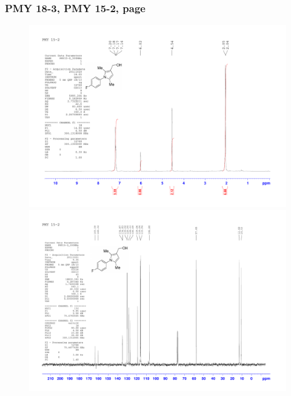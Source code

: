 \documentclass[12pt, a4paper,titlepage]{article}
\begin{document}
{\subsubsection*{PMY 18-3, PMY 15-2, page \pageref{exp:PMY15}}
\label{spec:PMY15}
	\begin{figure}[H] 
	\begin{center}
	\includegraphics[width=14.5cm]{expdata/PMY15/1H}
	\includegraphics[width=14.5cm]{expdata/PMY15/13C}
	\end{center}
	\end{figure}


}
\end{document}
